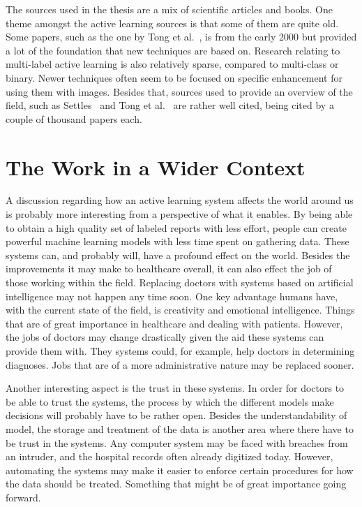 The sources used in the thesis are a mix of scientific articles and books.
One theme amongst the active learning sources is that some of them are quite old.
Some papers, such as the one by Tong et al.~\cite{tong2001support}, is from the early 2000 but provided a lot of the foundation that new techniques are based on.
Research relating to multi-label active learning is also relatively sparse, compared to multi-class or binary.
Newer techniques often seem to be focused on specific enhancement for using them with images.
Besides that, sources used to provide an overview of the field, such as Settles~\cite{settles2012active} and Tong et al\@.~\cite{tong2001active} are rather well cited, being cited by a couple of thousand papers each.

\section{The Work in a Wider Context}

A discussion regarding how an active learning system affects the world around us is probably more interesting from a perspective of what it enables.
By being able to obtain a high quality set of labeled reports with less effort, people can create powerful machine learning models with less time spent on gathering data.
These systems can, and probably will, have a profound effect on the world.
Besides the improvements it may make to healthcare overall, it can also effect the job of those working within the field.
Replacing doctors with systems based on artificial intelligence may not happen any time soon.
One key advantage humans have, with the current state of the field, is creativity and emotional intelligence.
Things that are of great importance in healthcare and dealing with patients.
However, the jobs of doctors may change drastically given the aid these systems can provide them with.
They systems could, for example, help doctors in determining diagnoses.
Jobs that are of a more administrative nature may be replaced sooner.

Another interesting aspect is the trust in these systems.
In order for doctors to be able to trust the systems, the process by which the different models make decisions will probably have to be rather open.
Besides the understandability of model, the storage and treatment of the data is another area where there have to be trust in the systems.
Any computer system may be faced with breaches from an intruder, and the hospital records often already digitized today.
However, automating the systems may make it easier to enforce certain procedures for how the data should be treated.
Something that might be of great importance going forward.